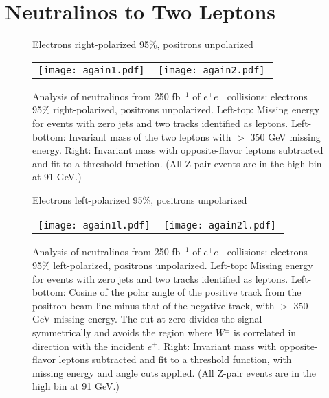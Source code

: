 \documentclass[12pt]{article}
\begin{document}
\section{Neutralinos to Two Leptons}

\begin{figure}[t]
  \begin{center}
    Electrons right-polarized 95\%, positrons unpolarized
    \begin{tabular}{p{0.49\linewidth} p{0.49\linewidth}}
      \begin{minipage}{\linewidth} \texttt{[image: again1.pdf]} \end{minipage} &
      \begin{minipage}{\linewidth} \texttt{[image: again2.pdf]} \end{minipage}
    \end{tabular}

    \caption{Analysis of neutralinos from 250 fb$^{-1}$ of $e^+e^-$
    collisions: electrons 95\% right-polarized, positrons unpolarized.
    Left-top: Missing energy for events with zero jets and two tracks
    identified as leptons.  Left-bottom: Invariant mass of the two
    leptons with $>$ 350 GeV missing energy.  Right: Invariant mass
    with opposite-flavor leptons subtracted and fit to a threshold
    function.  (All Z-pair events are in the high bin at 91 GeV.)}

    \label{jimptwoleptons}
  \end{center}
\end{figure}

\begin{figure}[t]
  \begin{center}
    Electrons left-polarized 95\%, positrons unpolarized
    \begin{tabular}{p{0.49\linewidth} p{0.49\linewidth}}
      \begin{minipage}{\linewidth} \texttt{[image: again1l.pdf]} \end{minipage} &
      \begin{minipage}{\linewidth} \texttt{[image: again2l.pdf]} \end{minipage}
    \end{tabular}

    \caption{Analysis of neutralinos from 250 fb$^{-1}$ of $e^+e^-$
    collisions: electrons 95\% left-polarized, positrons unpolarized.
    Left-top: Missing energy for events with zero jets and two tracks
    identified as leptons.  Left-bottom: Cosine of the polar angle of
    the positive track from the positron beam-line minus that of the
    negative track, with $>$ 350 GeV missing energy.  The cut at zero
    divides the signal symmetrically and avoids the region where
    $W^\pm$ is correlated in direction with the incident $e^\pm$.
    Right: Invariant mass with opposite-flavor leptons subtracted and
    fit to a threshold function, with missing energy and angle cuts
    applied.  (All Z-pair events are in the high bin at 91 GeV.)}

    \label{jimpleftleptons}
  \end{center}
\end{figure}
\end{document}
